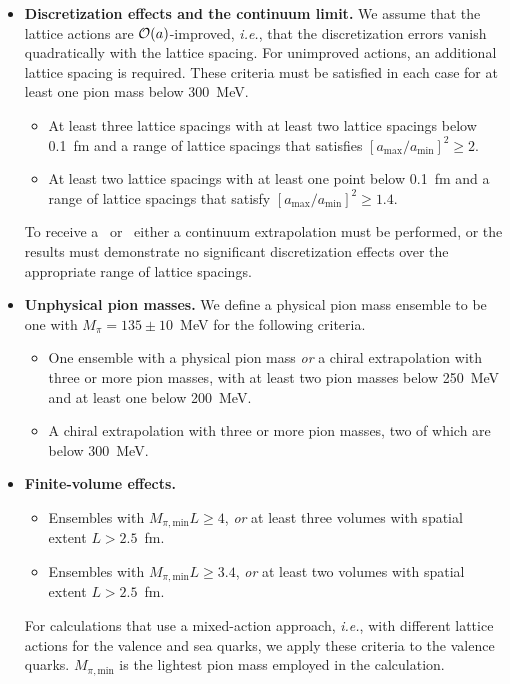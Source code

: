 \begin{itemize}
\item {\bfseries Discretization effects and the continuum limit.}
We assume that the lattice actions are ${\cal O}(a)$-improved, {\it i.e.}, 
that the discretization errors vanish quadratically with the lattice spacing. 
%
For unimproved actions, an additional lattice spacing is required. 
%
These criteria must be satisfied in each case for at 
least one pion mass below 300~MeV.
%
\begin{itemize}
%
\item[\bstar] At least three lattice spacings with at least two lattice 
spacings below 0.1~fm and a range of lattice spacings that satisfies 
$[a_{\mathrm{max}}/a_{\mathrm{min}}]^2 \geq 2$.
%
\item[\bcirc] At least two lattice spacings with at least one point below 
0.1~fm and a range of lattice spacings that satisfy
$[a_{\mathrm{max}}/a_{\mathrm{min}}]^2 \geq 1.4$.
%
\end{itemize}
%
To receive a \bstar~or \bcirc~either a continuum extrapolation must be 
performed, or the results must demonstrate no significant discretization 
effects over the appropriate range of lattice spacings.

\item {\bfseries Unphysical pion masses.}
We define a physical pion mass ensemble to be one with $M_\pi=135\pm 10$~MeV
for the following criteria.
%
\begin{itemize}
\item[\bstar] One ensemble with a physical pion mass \emph{or} a chiral 
extrapolation with three or more pion masses, with at least two pion masses 
below 250~MeV and at least one below 200~MeV.
%
\item[\bcirc] A chiral extrapolation with three or more pion masses, two of 
which are below 300~MeV.
%
\end{itemize}

\item {\bfseries Finite-volume effects.}
%
\begin{itemize}
% 
\item[\bstar] Ensembles with $M_{\pi,\mathrm{min}}L\geq 4$, \emph{or} at least
three volumes with spatial extent $L>2.5$~fm.
\item[\bcirc] Ensembles with $M_{\pi,\mathrm{min}}L \geq 3.4$, \emph{or} at least
two volumes with spatial extent $L>2.5$~fm.
\end{itemize}
For calculations that use a mixed-action approach, {\it i.e.},
with different lattice actions for the valence and sea quarks,
we apply these criteria to the valence quarks. $M_{\pi,\mathrm{min}}$ is 
the lightest pion mass employed in the calculation. 


\end{itemize}
